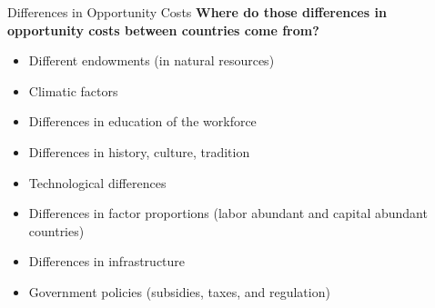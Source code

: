 \documentclass{beamer}
\begin{document}
\begin{frame}{Differences in Opportunity Costs}
    \textbf{Where do those differences in opportunity costs between countries come from?} \pause
    \begin{itemize} \small
        \item Different endowments (in natural resources)
        \item Climatic factors
        \item Differences in education of the workforce
        \item Differences in history, culture, tradition %
        \item Technological differences %
        \item Differences in factor proportions (labor abundant and capital abundant countries)
        \item Differences in infrastructure 
        \item Government policies (subsidies, taxes, and regulation)
    \end{itemize}
\end{frame}
\end{document}
